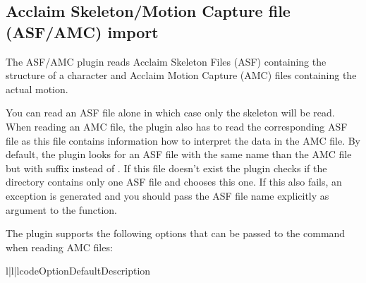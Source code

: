 
\subsection{Acclaim Skeleton/Motion Capture file (ASF/AMC) import}

The ASF/AMC plugin reads Acclaim Skeleton Files (ASF) containing
the structure of a character and Acclaim Motion Capture (AMC) files
containing the actual motion.

You can read an ASF file alone in which case only the skeleton will
be read. When reading an AMC file, the plugin also has to read the
corresponding ASF file as this file contains information how to interpret
the data in the AMC file. By default, the plugin looks for an ASF file
with the same name than the AMC file but with suffix  instead
of . If this file doesn't exist the plugin checks if the
directory contains only one ASF file and chooses this one. If this also
fails, an exception is generated and you should pass the ASF
file name explicitly as argument to the  function.

The plugin supports the following options that can be passed to
the  command when reading AMC files:

\begin{tableiii}{l|l|l}{code}{Option}{Default}{Description}
\end{tableiii}



